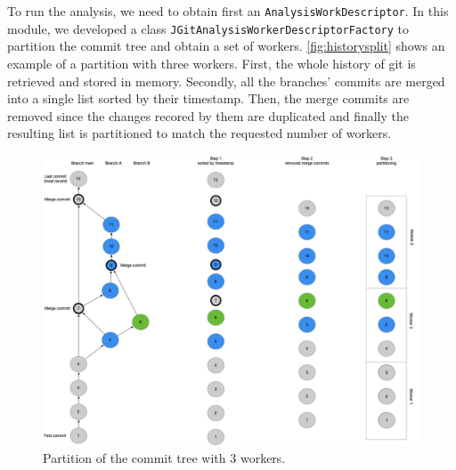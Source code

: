 To run the analysis, we need to obtain first an \texttt{AnalysisWorkDescriptor}. 
In this module, we developed a class \texttt{JGitAnalysisWorkerDescriptorFactory} to partition the commit tree and obtain a set of workers. 
\autoref{fig:historysplit} shows an example of a partition with three workers. First, the whole history of git is retrieved and stored in memory. Secondly, all the branches' commits are merged into a single list sorted by their timestamp. 
Then, the merge commits are removed since the changes recored by them are duplicated and finally the resulting list is partitioned to match the requested number of workers. 
\begin{figure}
    \center
    \includegraphics[width=\textwidth]{HistorySplit.jpg}
    \caption{Partition of the commit tree with 3 workers.}
    \label{fig:historysplit}
\end{figure}


